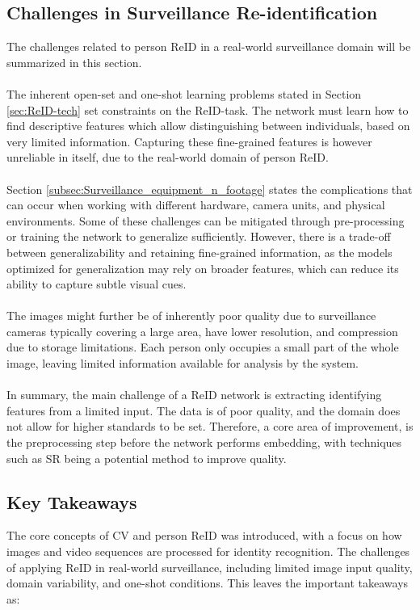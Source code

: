 \subsection{Challenges in Surveillance Re-identification}
\label{subsec:challenges-ReID}
The challenges related to person \acs{ReID} in a real-world surveillance domain will be summarized in this section.
\\\\
The inherent open-set and one-shot learning problems stated in Section \ref{sec:ReID-tech} set constraints on the \acs{ReID}-task. The network must learn how to find descriptive features which allow distinguishing between individuals, based on very limited information. Capturing these fine-grained features is however unreliable in itself, due to the real-world domain of person \acs{ReID}.
\\\\
Section \ref{subsec:Surveillance_equipment_n_footage} states the complications that can occur when working with different hardware, camera units, and physical environments. Some of these challenges can be mitigated through pre-processing or training the network to generalize sufficiently. However, there is a trade-off between generalizability and retaining fine-grained information, as the models optimized for generalization may rely on broader features, which can reduce its ability to capture subtle visual cues.
\\\\
The images might further be of inherently poor quality due to surveillance cameras typically covering a large area, have lower resolution, and compression due to storage limitations. Each person only occupies a small part of the whole image, leaving limited information available for analysis by the system. 
\\\\
In summary, the main challenge of a \acs{ReID} network is extracting identifying features from a limited input. The data is of poor quality, and the domain does not allow for higher standards to be set. Therefore, a core area of improvement, is the preprocessing step before the network performs embedding, with techniques such as \acs{SR} being a potential method to improve quality.

\subsection{Key Takeaways}

The core concepts of \acs{CV} and person \acs{ReID} was introduced, with a focus on how images and video sequences are processed for identity recognition. The challenges of applying \acs{ReID} in real-world surveillance, including limited image input quality, domain variability, and one-shot conditions. This leaves the important takeaways as:

